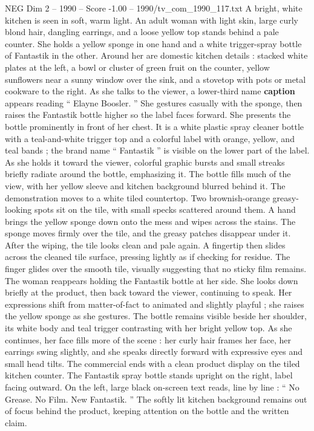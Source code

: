 \begin{textsample}{NEG Dim 2 – 1990 – Score -1.00 – 1990/tv\_com\_1990\_117.txt}  \label{ex:f2_neg_061}
A bright, white kitchen is seen in soft, warm light.
An adult woman with light skin, large curly blond hair, dangling earrings, and a loose yellow top stands behind a pale counter.
She holds a yellow sponge in one hand and a white trigger-spray bottle of Fantastik in the other.
Around her are domestic kitchen details : stacked white plates at the left, a bowl or cluster of green fruit on the counter, yellow sunflowers near a sunny window over the sink, and a stovetop with pots or metal cookware to the right.
As she talks to the viewer, a lower-third name \textbf{caption} appears reading “ Elayne Boosler. ” She gestures casually with the sponge, then raises the Fantastik bottle higher so the label faces forward.
She presents the bottle prominently in front of her chest.
It is a white plastic spray cleaner bottle with a teal-and-white trigger top and a colorful label with orange, yellow, and teal bands ; the brand name “ Fantastik ” is visible on the lower part of the label.
As she holds it toward the viewer, colorful graphic bursts and small streaks briefly radiate around the bottle, emphasizing it.
The bottle fills much of the view, with her yellow sleeve and kitchen background blurred behind it.
The demonstration moves to a white tiled countertop.
Two brownish-orange greasy-looking spots sit on the tile, with small specks scattered around them.
A hand brings the yellow sponge down onto the mess and wipes across the stains.
The sponge moves firmly over the tile, and the greasy patches disappear under it.
After the wiping, the tile looks clean and pale again.
A fingertip then slides across the cleaned tile surface, pressing lightly as if checking for residue.
The finger glides over the smooth tile, visually suggesting that no sticky film remains.
The woman reappears holding the Fantastik bottle at her side.
She looks down briefly at the product, then back toward the viewer, continuing to speak.
Her expressions shift from matter-of-fact to animated and slightly playful ; she raises the yellow sponge as she gestures.
The bottle remains visible beside her shoulder, its white body and teal trigger contrasting with her bright yellow top.
As she continues, her face fills more of the scene : her curly hair frames her face, her earrings swing slightly, and she speaks directly forward with expressive eyes and small head tilts.
The commercial ends with a clean product display on the tiled kitchen counter.
The Fantastik spray bottle stands upright on the right, label facing outward.
On the left, large black on-screen text reads, line by line : “ No Grease.
No Film.
New Fantastik. ” The softly lit kitchen background remains out of focus behind the product, keeping attention on the bottle and the written claim.

\end{textsample}
